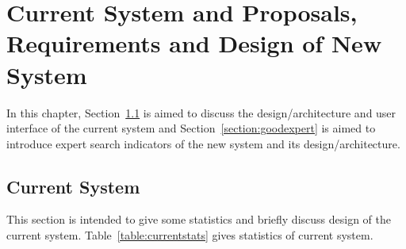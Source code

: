 
\chapter{Current System and Proposals, Requirements and Design of New System}\label{sec:currentsystemandproposals}
In this chapter, Section~\ref{sec:currentsystem} is aimed to discuss the design/architecture and user interface of the current system and 
Section~\ref{section:goodexpert} is aimed to introduce expert search indicators of the new system and its design/architecture.

\section{Current System}\label{sec:currentsystem}
This section is intended to give some statistics and briefly discuss design of the current system. Table~\ref{table:currentstats} gives statistics 
of current system.
\begin{table}
\centering
{}
\caption{Statistics of Current System} \label{table:currentstats}
\end{table}

